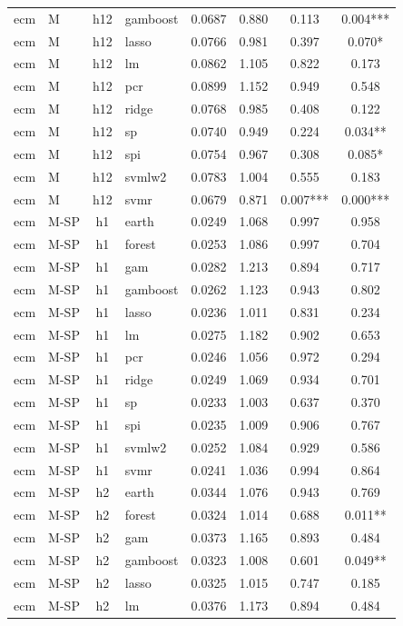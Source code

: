 \begin{ThreePartTable}
\begin{longtable}[t]{llclcccc}
ecm & M & h12 & gamboost & 0.0687 & 0.880 & 0.113 & 0.004***\\
ecm & M & h12 & lasso & 0.0766 & 0.981 & 0.397 & 0.070*\\
ecm & M & h12 & lm & 0.0862 & 1.105 & 0.822 & 0.173\\
ecm & M & h12 & pcr & 0.0899 & 1.152 & 0.949 & 0.548\\
ecm & M & h12 & ridge & 0.0768 & 0.985 & 0.408 & 0.122\\
ecm & M & h12 & sp & 0.0740 & 0.949 & 0.224 & 0.034**\\
ecm & M & h12 & spi & 0.0754 & 0.967 & 0.308 & 0.085*\\
ecm & M & h12 & svmlw2 & 0.0783 & 1.004 & 0.555 & 0.183\\
ecm & M & h12 & svmr & 0.0679 & 0.871 & 0.007*** & 0.000***\\
\addlinespace
ecm & M-SP & h1 & earth & 0.0249 & 1.068 & 0.997 & 0.958\\
ecm & M-SP & h1 & forest & 0.0253 & 1.086 & 0.997 & 0.704\\
ecm & M-SP & h1 & gam & 0.0282 & 1.213 & 0.894 & 0.717\\
ecm & M-SP & h1 & gamboost & 0.0262 & 1.123 & 0.943 & 0.802\\
ecm & M-SP & h1 & lasso & 0.0236 & 1.011 & 0.831 & 0.234\\
ecm & M-SP & h1 & lm & 0.0275 & 1.182 & 0.902 & 0.653\\
ecm & M-SP & h1 & pcr & 0.0246 & 1.056 & 0.972 & 0.294\\
ecm & M-SP & h1 & ridge & 0.0249 & 1.069 & 0.934 & 0.701\\
ecm & M-SP & h1 & sp & 0.0233 & 1.003 & 0.637 & 0.370\\
ecm & M-SP & h1 & spi & 0.0235 & 1.009 & 0.906 & 0.767\\
ecm & M-SP & h1 & svmlw2 & 0.0252 & 1.084 & 0.929 & 0.586\\
ecm & M-SP & h1 & svmr & 0.0241 & 1.036 & 0.994 & 0.864\\
\addlinespace
ecm & M-SP & h2 & earth & 0.0344 & 1.076 & 0.943 & 0.769\\
ecm & M-SP & h2 & forest & 0.0324 & 1.014 & 0.688 & 0.011**\\
ecm & M-SP & h2 & gam & 0.0373 & 1.165 & 0.893 & 0.484\\
ecm & M-SP & h2 & gamboost & 0.0323 & 1.008 & 0.601 & 0.049**\\
ecm & M-SP & h2 & lasso & 0.0325 & 1.015 & 0.747 & 0.185\\
ecm & M-SP & h2 & lm & 0.0376 & 1.173 & 0.894 & 0.484\\

\end{longtable}
\end{ThreePartTable}
